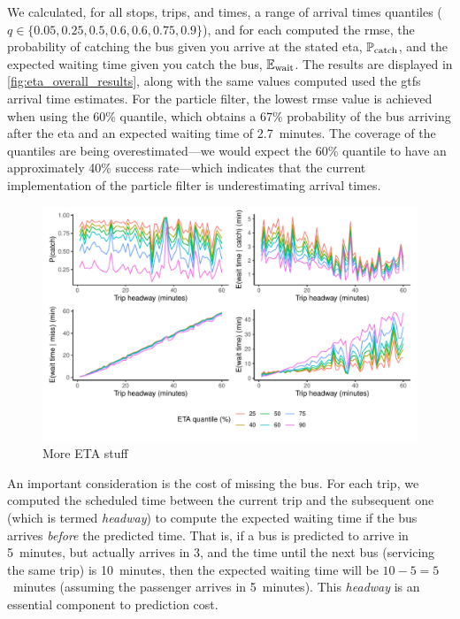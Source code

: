 We calculated, for all stops, trips, and times, a range of arrival times quantiles ($q \in \{0.05, 0.25, 0.5, 0.6, 0.6, 0.75, 0.9\}$), and for each computed the \gls{rmse}, the probability of catching the bus given you arrive at the stated \gls{eta}, $\mathbb{P}_\text{catch}$, and the expected waiting time given you catch the bus, $\mathbb{E}_\text{wait}$. The results are displayed in \cref{fig:eta_overall_results}, along with the same values computed used the \gls{gtfs} arrival time estimates. For the particle filter, the lowest \gls{rmse} value is achieved when using the 60\% quantile, which obtains a 67\% probability of the bus arriving after the \gls{eta} and an expected waiting time of 2.7~minutes. The coverage of the quantiles are being overestimated---we would expect the 60\% quantile to have an approximately 40\% success rate---which indicates that the current implementation of the particle filter is underestimating arrival times.


\begin{knitrout}\small
{}\color{fgcolor}\begin{figure}

{\centering \includegraphics[width=\textwidth]{figure/eta_headway_results-1} 

}

\caption[More ETA stuff]{More ETA stuff}\label{fig:eta_headway_results}
\end{figure}


\end{knitrout}

An important consideration is the cost of missing the bus. For each trip, we computed the scheduled time between the current trip and the subsequent one (which is termed \emph{headway}) to compute the expected waiting time if the bus arrives \emph{before} the predicted time. That is, if a bus is predicted to arrive in 5~minutes, but actually arrives in 3, and the time until the next bus (servicing the same trip) is 10~minutes, then the expected waiting time will be $10-5=5$~minutes (assuming the passenger arrives in 5~minutes). This \emph{headway} is an essential component to prediction cost.

